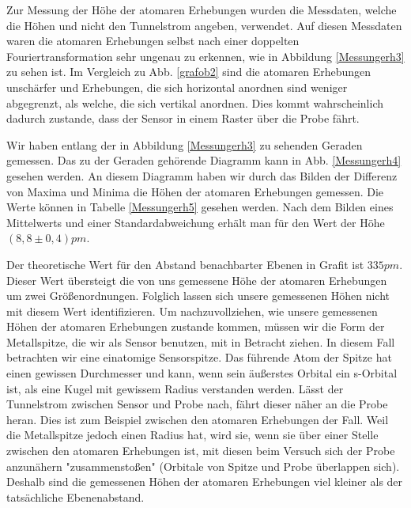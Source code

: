 \documentclass[10pt,a4paper]{article}
\begin{document}
Zur Messung der Höhe der atomaren Erhebungen wurden die Messdaten, welche die Höhen und nicht den Tunnelstrom angeben, verwendet. Auf diesen Messdaten waren die atomaren Erhebungen selbst nach einer doppelten Fouriertransformation sehr ungenau zu erkennen, wie in Abbildung \ref{Messungerh3} zu sehen ist. Im Vergleich zu Abb. \ref{grafob2} sind die atomaren Erhebungen unschärfer und Erhebungen, die sich horizontal anordnen sind weniger abgegrenzt, als welche, die sich vertikal anordnen. Dies kommt wahrscheinlich dadurch zustande, dass der Sensor in einem Raster über die Probe fährt.

Wir haben entlang der in Abbildung \ref{Messungerh3} zu sehenden Geraden gemessen. Das zu der Geraden gehörende Diagramm kann in Abb. \ref{Messungerh4} gesehen werden. An diesem Diagramm haben wir durch das Bilden der Differenz von Maxima und Minima die Höhen der atomaren Erhebungen gemessen. Die Werte können in Tabelle \ref{Messungerh5} gesehen werden. Nach dem Bilden eines Mittelwerts und einer Standardabweichung erhält man für den Wert der Höhe $(8,8 \pm 0,4) pm$.

Der theoretische Wert für den Abstand benachbarter Ebenen in Grafit ist $335 pm$. Dieser Wert übersteigt die von uns gemessene Höhe der atomaren Erhebungen um zwei Größenordnungen. Folglich lassen sich unsere gemessenen Höhen nicht mit diesem Wert identifizieren. Um nachzuvollziehen, wie unsere gemessenen Höhen der atomaren Erhebungen zustande kommen, müssen wir die Form der Metallspitze, die wir als Sensor benutzen, mit in Betracht ziehen. In diesem Fall betrachten wir eine einatomige Sensorspitze. Das führende Atom der Spitze hat einen gewissen Durchmesser und kann, wenn sein äußerstes Orbital ein s-Orbital ist, als eine Kugel mit gewissem Radius verstanden werden. Lässt der Tunnelstrom zwischen Sensor und Probe nach, fährt dieser näher an die Probe heran. Dies ist zum Beispiel zwischen den atomaren Erhebungen der Fall. Weil die Metallspitze jedoch einen Radius hat, wird sie, wenn sie über einer Stelle zwischen den atomaren Erhebungen ist, mit diesen beim Versuch sich der Probe anzunähern "zusammenstoßen" (Orbitale von Spitze und Probe überlappen sich). Deshalb sind die gemessenen Höhen der atomaren Erhebungen viel kleiner als der tatsächliche Ebenenabstand.
\end{document}
